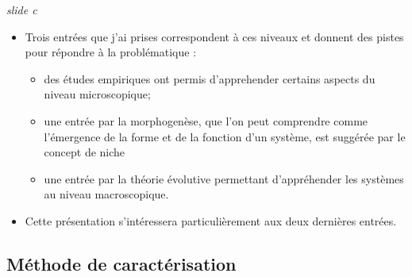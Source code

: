 \documentclass[12pt]{article}
\begin{document}
\newpage

\textit{slide c}

\begin{itemize}	
	\item Trois entrées que j'ai prises correspondent à ces niveaux et donnent des pistes pour répondre à la problématique : 
		\begin{itemize}
			\item des études empiriques ont permis d'apprehender certains aspects du niveau microscopique;
			\item une entrée par la morphogenèse, que l'on peut comprendre comme l'émergence de la forme et de la fonction d'un système, est suggérée par le concept de niche 
			\item une entrée par la théorie évolutive permettant d'appréhender les systèmes au niveau macroscopique.
		\end{itemize}
	\item Cette présentation s'intéressera particulièrement aux deux dernières entrées.
\end{itemize}


\newpage


\subsection*{Méthode de caractérisation}
\end{document}
